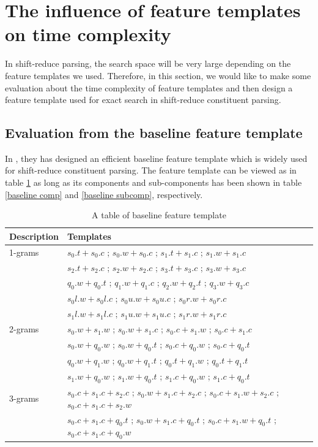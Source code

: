 \section{The influence of feature templates on time complexity}
In shift-reduce parsing, the search space will be very large depending on the feature templates we used. Therefore, in this section, we would like to make some evaluation about the time complexity of feature templates and then design a feature template used for exact search in shift-reduce constituent parsing.

\subsection{Evaluation from the baseline feature template}
In \cite{ref:2009Zhang}, they has designed an efficient baseline feature template which is widely used for shift-reduce constituent parsing. The feature template can be viewed as in table \ref{baseline feat} as long as its components and sub-components has been shown in table \ref{baseline comp} and \ref{baseline subcomp}, respectively.

\begin{table}[t]
	\caption{\label{baseline feat} A table of baseline feature template}
	\begin{center}
		\begin{tabular}{|l|l|}
			\hline 
			Description & Templates  \\ 
			\hline
			1-grams 	& $s_0.t+s_0.c$   ;   $s_0.w+s_0.c$ ; $s_1.t+s_1.c$   ;   $s_1.w+s_1.c$ \\
			& $s_2.t+s_2.c$   ;   $s_2.w+s_2.c$   ;   $s_3.t+s_3.c$   ;   $s_3.w+s_3.c$ \\
			& $q_0.w+q_0.t$   ;   $q_1.w+q_1.c$   ;   $q_2.w+q_2.t$   ;   $q_3.w+q_3.c$ \\
			
			& $s_0l.w+s_0l.c$   ;   $s_0u.w+s_0u.c$   ;   $s_0r.w+s_0r.c$ \\
			& $s_1l.w+s_1l.c$   ;   $s_1u.w+s_1u.c$   ;   $s_1r.w+s_1r.c$ \\
			\hline
			2-grams 	& $s_0.w+s_1.w$   ;   $s_0.w+s_1.c$   ;   $s_0.c+s_1.w$   ;   $s_0.c+s_1.c$ \\
			& $s_0.w+q_0.w$   ;   $s_0.w+q_0.t$   ;   $s_0.c+q_0.w$   ;   $s_0.c+q_0.t$ \\
			& $q_0.w+q_1.w$   ;   $q_0.w+q_1.t$   ;   $q_0.t+q_1.w$   ;   $q_0.t+q_1.t$ \\
			& $s_1.w+q_0.w$   ;   $s_1.w+q_0.t$   ;   $s_1.c+q_0.w$   ;   $s_1.c+q_0.t$ \\
			\hline
			3-grams 	& $s_0.c+s_1.c+s_2.c$   ;   $s_0.w+s_1.c+s_2.c$ ; $s_0.c+s_1.w+s_2.c$   ;   $s_0.c+s_1.c+s_2.w$ \\
			& $s_0.c+s_1.c+q_0.t$   ;   $s_0.w+s_1.c+q_0.t$   ;   $s_0.c+s_1.w+q_0.t$   ;   $s_0.c+s_1.c+q_0.w$ \\
			\hline
		\end{tabular}
	\end{center}
\end{table}

